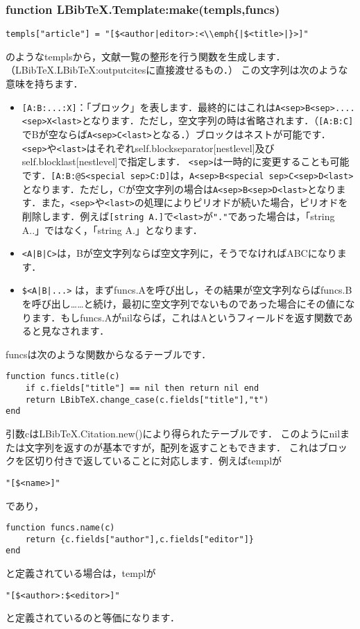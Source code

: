 \documentclass[a4paper]{ltjsarticle}
\begin{document}
\subsubsection{function LBibTeX.Template:make(templs,funcs)}
\begin{lstlisting}
templs["article"] = "[$<author|editor>:<\\emph{|$<title>|}>]"
\end{lstlisting}
のようなtemplsから，文献一覧の整形を行う関数を生成します．（LBibTeX.LBibTeX:outputcitesに直接渡せるもの．）
この文字列は次のような意味を持ちます．
\begin{itemize}
\item \verb|[A:B:...:X]|：「ブロック」を表します．最終的にはこれは\verb|A<sep>B<sep>....<sep>X<last>|となります．ただし，空文字列の時は省略されます．（\verb|[A:B:C]|でBが空ならば\verb|A<sep>C<last>|となる．）ブロックはネストが可能です．\verb|<sep>|や\verb|<last>|はそれぞれself.blockseparator[nestlevel]及びself.blocklast[nestlevel]で指定します．
\verb|<sep>|は一時的に変更することも可能です．\verb|[A:B:@S<special sep>C:D]|は，\verb|A<sep>B<special sep>C<sep>D<last>|となります．ただし，Cが空文字列の場合は\verb|A<sep>B<sep>D<last>|となります．また，\verb|<sep>|や\verb|<last>|の処理によりピリオドが続いた場合，ピリオドを削除します．例えば\verb|[string A.]|で\verb|<last>|が\verb|"."|であった場合は，「string A..」ではなく，「string A.」となります．
\item \verb:<A|B|C>:は，Bが空文字列ならば空文字列に，そうでなければABCになります．
\item \verb:$<A|B|...>:
は，まずfuncs.Aを呼び出し，その結果が空文字列ならばfuncs.Bを呼び出し……と続け，最初に空文字列でないものであった場合にその値になります．もしfuncs.Aがnilならば，これはAというフィールドを返す関数であると見なされます．
\end{itemize}
funcsは次のような関数からなるテーブルです．
\begin{lstlisting}
function funcs.title(c)
	if c.fields["title"] == nil then return nil end
	return LBibTeX.change_case(c.fields["title"],"t")
end
\end{lstlisting}
引数cはLBibTeX.Citation.new()により得られたテーブルです．
このようにnilまたは文字列を返すのが基本ですが，配列を返すこともできます．
これはブロックを区切り付きで返していることに対応します．例えばtemplが
\begin{lstlisting}
"[$<name>]"
\end{lstlisting}
であり，
\begin{lstlisting}
function funcs.name(c)
	return {c.fields["author"],c.fields["editor"]}
end
\end{lstlisting}
と定義されている場合は，templが
\begin{lstlisting}
"[$<author>:$<editor>]"
\end{lstlisting}
と定義されているのと等価になります．
\end{document}
